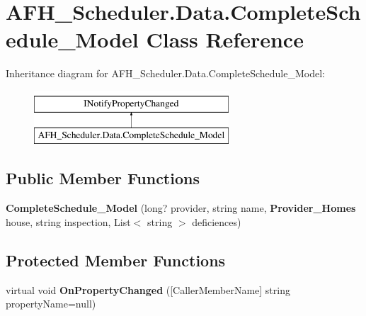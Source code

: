 \section{A\+F\+H\+\_\+\+Scheduler.\+Data.\+Complete\+Schedule\+\_\+\+Model Class Reference}
\label{class_a_f_h___scheduler_1_1_data_1_1_complete_schedule___model}
Inheritance diagram for A\+F\+H\+\_\+\+Scheduler.\+Data.\+Complete\+Schedule\+\_\+\+Model\+:\begin{figure}[H]
\begin{center}
\leavevmode
\includegraphics[height=2.000000cm]{class_a_f_h___scheduler_1_1_data_1_1_complete_schedule___model}
\end{center}
\end{figure}
\subsection*{Public Member Functions}
\begin{DoxyCompactItemize}
\item 
\mbox{\label{class_a_f_h___scheduler_1_1_data_1_1_complete_schedule___model_a48abc2a38ee824cb08e2cff62f356ca2}} 
{\bfseries Complete\+Schedule\+\_\+\+Model} (long? provider, string name, \textbf{ Provider\+\_\+\+Homes} house, string inspection, List$<$ string $>$ deficiences)
\end{DoxyCompactItemize}
\subsection*{Protected Member Functions}
\begin{DoxyCompactItemize}
\item 
\mbox{\label{class_a_f_h___scheduler_1_1_data_1_1_complete_schedule___model_ae38a3289d3a3ce60ca77b2b32d386b33}} 
virtual void {\bfseries On\+Property\+Changed} ([Caller\+Member\+Name] string property\+Name=null)
\end{DoxyCompactItemize}
